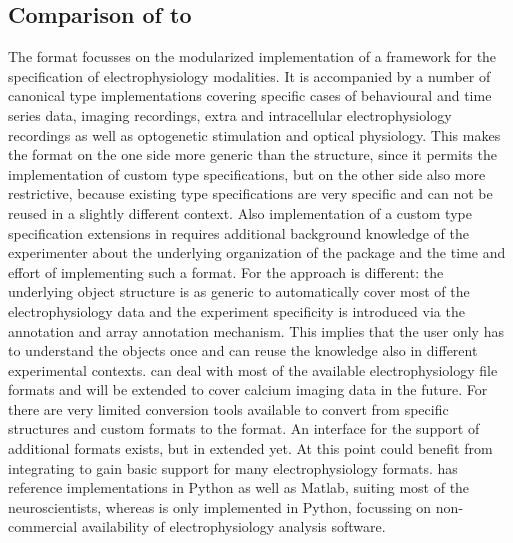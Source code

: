 \subsection{Comparison of  to }
The  format focusses on the modularized implementation of a framework for the specification of electrophysiology modalities. %
It is accompanied by a number of canonical type implementations covering specific cases of behavioural  and time series data, imaging recordings, extra and intracellular electrophysiology recordings as well as optogenetic stimulation and optical physiology.  %
This makes the  format on the one side more generic than the  structure, since it permits the implementation of custom type specifications, but on the other side also more restrictive, because existing type specifications are very specific and can not be reused in a slightly different context. Also implementation of a custom type specification extensions in  requires additional background knowledge of the experimenter about the underlying organization of the  package and the time and effort of implementing such a format. %
For  the approach is different: the underlying object structure is as generic to automatically cover most of the electrophysiology data and the experiment specificity is introduced via the annotation and array annotation mechanism. This implies that the user only has to understand the  objects once and can reuse the knowledge also in different experimental contexts.
 can deal with most of the available electrophysiology file formats and will be extended to cover calcium imaging data in the future. For  there are very limited conversion tools available to convert from specific  structures and custom formats to the  format. %
An interface for the support of additional formats exists, but in extended yet. At this point  could benefit from integrating  to gain basic support for many electrophysiology formats.
 has reference implementations in Python as well as Matlab, suiting most of the neuroscientists, whereas  is only implemented in Python, focussing on non-commercial availability of electrophysiology analysis software.


